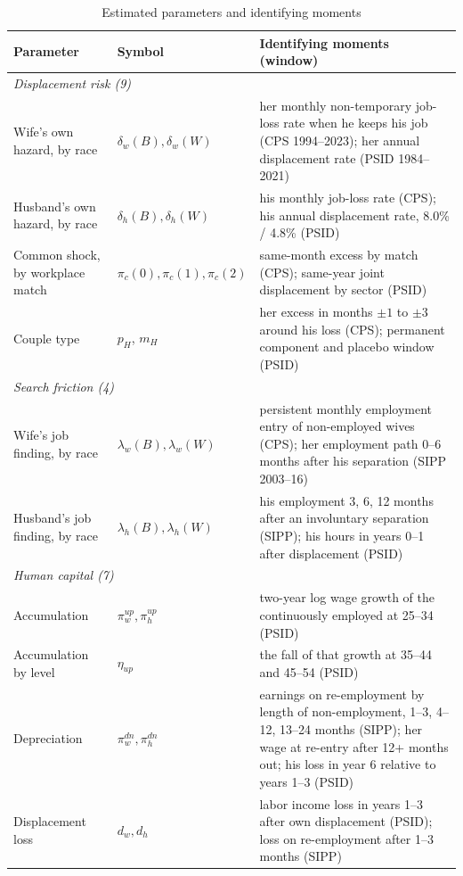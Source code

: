 \begin{table}[htbp]\centering\footnotesize
\caption{Estimated parameters and identifying moments}\label{tab:model_params}
\begin{tabular}{p{4.0cm}p{2.6cm}p{8.2cm}}
\toprule
Parameter & Symbol & Identifying moments (window) \\
\midrule
\multicolumn{3}{l}{\textit{Displacement risk (9)}} \\
Wife's own hazard, by race & $\delta_w(B), \delta_w(W)$ & her monthly non-temporary job-loss rate when he keeps his job (CPS 1994--2023); her annual displacement rate (PSID 1984--2021) \\
Husband's own hazard, by race & $\delta_h(B), \delta_h(W)$ & his monthly job-loss rate (CPS); his annual displacement rate, 8.0\% / 4.8\% (PSID) \\
Common shock, by workplace match & $\pi_c(0), \pi_c(1), \pi_c(2)$ & same-month excess by match (CPS); same-year joint displacement by sector (PSID) \\
Couple type & $p_H$, $m_H$ & her excess in months $\pm 1$ to $\pm 3$ around his loss (CPS); permanent component and placebo window (PSID) \\
\multicolumn{3}{l}{\textit{Search friction (4)}} \\
Wife's job finding, by race & $\lambda_w(B), \lambda_w(W)$ & persistent monthly employment entry of non-employed wives (CPS); her employment path 0--6 months after his separation (SIPP 2003--16) \\
Husband's job finding, by race & $\lambda_h(B), \lambda_h(W)$ & his employment 3, 6, 12 months after an involuntary separation (SIPP); his hours in years 0--1 after displacement (PSID) \\
\multicolumn{3}{l}{\textit{Human capital (7)}} \\
Accumulation & $\pi^{up}_w, \pi^{up}_h$ & two-year log wage growth of the continuously employed at 25--34 (PSID) \\
Accumulation by level & $\eta_{up}$ & the fall of that growth at 35--44 and 45--54 (PSID) \\
Depreciation & $\pi^{dn}_w, \pi^{dn}_h$ & earnings on re-employment by length of non-employment, 1--3, 4--12, 13--24 months (SIPP); her wage at re-entry after 12+ months out; his loss in year 6 relative to years 1--3 (PSID) \\
Displacement loss & $d_w, d_h$ & labor income loss in years 1--3 after own displacement (PSID); loss on re-employment after 1--3 months (SIPP) \\

\end{tabular}
\end{table}
